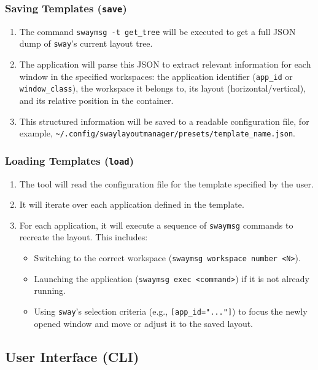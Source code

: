 \documentclass[12pt, letterpaper]{article}
\begin{document}
\subsubsection*{Saving Templates (\texttt{save})}
\begin{enumerate}
    \item The command \texttt{swaymsg -t get\_tree} will be executed to get a full JSON dump of \texttt{sway}'s current layout tree.
    \item The application will parse this JSON to extract relevant information for each window in the specified workspaces: the application identifier (\texttt{app\_id} or \texttt{window\_class}), the workspace it belongs to, its layout (horizontal/vertical), and its relative position in the container.
    \item This structured information will be saved to a readable configuration file, for example, \texttt{\~{}/.config/swaylayoutmanager/presets/template\_name.json}.
\end{enumerate}

\subsubsection*{Loading Templates (\texttt{load})}
\begin{enumerate}
    \item The tool will read the configuration file for the template specified by the user.
    \item It will iterate over each application defined in the template.
    \item For each application, it will execute a sequence of \texttt{swaymsg} commands to recreate the layout. This includes:
    \begin{itemize}
        \item Switching to the correct workspace (\texttt{swaymsg workspace number <N>}).
        \item Launching the application (\texttt{swaymsg exec <command>}) if it is not already running.
        \item Using \texttt{sway}'s selection criteria (e.g., \texttt{[app\_id="..."]}) to focus the newly opened window and move or adjust it to the saved layout.
    \end{itemize}
\end{enumerate}

\subsection*{User Interface (CLI)}
\end{document}
